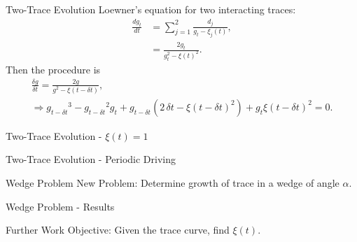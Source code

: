 \documentclass{beamer}
\begin{document}
\begin{frame}{Two-Trace Evolution}
    Loewner's equation for two interacting traces:
    \begin{align*}
        \frac{dg_t}{dt} &= \sum_{j=1}^2 \frac{d_j}{g_t - \xi_j (t)}, \\
        &= \frac{2g_t}{g_t^2 - \xi(t)^2}.
    \end{align*}
    Then the procedure is
    \begin{gather*}
        \frac{\delta g}{\delta t} =  \frac{2g}{g^2 - \xi(t - \delta t)}, \\
     \Rightarrow {g_{t - \delta t}}^{3} - {g_{t - \delta t}}^{2} {g_t} + {g_{t -\delta t}} (2 \, {\delta t} - {\xi(t - \delta t)}^{2} ) + {g_t} {\xi(t - \delta t)}^{2} = 0.
    \end{gather*}
\end{frame}

\begin{frame}{Two-Trace Evolution - $\xi(t) = 1$}
\begin{adjustbox}{max totalsize={\textwidth}{\textheight}}

\end{adjustbox}
\end{frame}

\begin{frame}{Two-Trace Evolution - Periodic Driving}
\begin{adjustbox}{max totalsize={\textwidth}{0.85\textheight}, center}

\end{adjustbox}
\end{frame}

\begin{frame}{Wedge Problem}
    New Problem: Determine growth of trace in a wedge of angle $\alpha$.\\[10pt]
\begin{adjustbox}{max totalsize={\textwidth}{\textheight}, center}

\end{adjustbox}
\end{frame}

\begin{frame}{Wedge Problem - Results}
\begin{adjustbox}{max totalsize={\textwidth}{\textheight}}

\end{adjustbox}
\end{frame}

\begin{frame}{Further Work}
    Objective: Given the trace curve, find $\xi(t)$.
\begin{adjustbox}{max totalsize={\textwidth}{\textheight}}

\end{adjustbox}
\end{frame}
\end{document}
